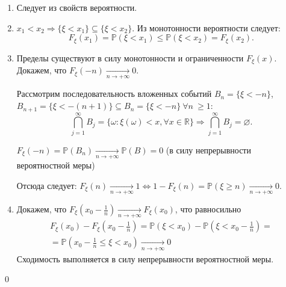\documentclass[oneside,final,14pt]{extreport}
\newcommand\myprob[1]{{\mathbb{P}(#1)}}
\renewenvironment{proof}{{\bfseries Доказательство.}}{\qed}
\theoremstyle{plain}
\theoremstyle{definition}
\theoremstyle{named}
\begin{document}
\begin{proof}
\begin{enumerate}
    \item Следует из свойств вероятности.
    \item 
        $x_1 < x_2 \Rightarrow \{\xi < x_1 \} \subseteq \{\xi < x_2\}$. Из монотонности вероятности следует:
        \begin{equation*}
            F_\xi(x_1) = \myprob{\xi < x_1} \leqslant \myprob{\xi < x_2} = F_\xi(x_2).
        \end{equation*}
    \item 
        Пределы существуют в силу монотонности и ограниченности $F_\xi(x)$. Докажем, что $F_\xi(-n) \xrightarrow[n \to +\infty]{} 0$.
        
        Рассмотрим последовательность вложенных событий $B_n = \{\xi < -n \}$, $B_{n+1} = \{\xi < -(n+1) \} \subseteq B_n = \{\xi < -n \} ~ \forall n ~ \geqslant 1$:
        \begin{equation*}
            \bigcap\limits_{j = 1}^{\infty}B_j = \{\omega \colon \xi(\omega) < x, \forall x \in \mathbb{R} \} \Rightarrow \bigcap\limits_{j = 1}^{\infty}B_j = \varnothing.
        \end{equation*}
    
        $F_\xi(-n) = \myprob{B_n} \xrightarrow[n \to +\infty]{} \myprob{B} = 0$ (в силу непрерывности вероятностной меры)
    
        Отсюда следует: $F_\xi(n) \xrightarrow[n \to +\infty]{} 1 \Leftrightarrow 1 - F_\xi(n) = \myprob{\xi \geqslant n} \xrightarrow[n \to +\infty]{} 0$.

    \item
        Докажем, что $F_\xi(x_0 - \frac{1}{n}) \xrightarrow[n \to +\infty]{} F_\xi(x_0)$, что равносильно 
        \begin{multline*}
            F_\xi(x_0) - F_\xi \left(x_0 - \frac{1}{n} \right) 
            = \myprob{\xi < x_0} - \mathbb{P}\left( \xi < x_0 - \frac{1}{n} \right) = \\ 
            = \mathbb{P}\left( x_0 - \frac{1}{n} \leqslant \xi < x_0 \right) \xrightarrow[n \to +\infty]{} 0
                \end{multline*}
        Сходимость выполняется в силу непрерывности вероятностной меры.
\end{enumerate}
\end{proof}
\end{document}
